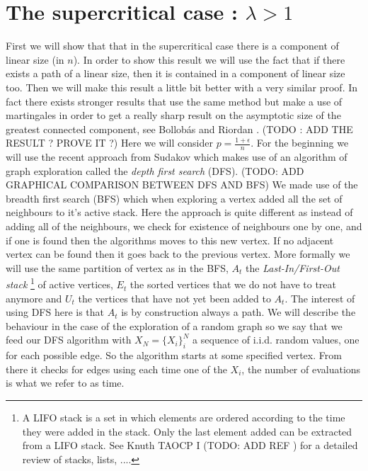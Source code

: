 \section{The supercritical case : $\lambda > 1 $ }
First we will show that that in the supercritical case there is a component of linear size (in $n$). In order to show this result we will use the fact that if there exists a path of a linear size, then it is contained in a component of linear size too. Then we will make this result a little bit better with a very similar proof.
\newline
In fact there exists stronger results that use the same method but make a use of martingales in order to get a really sharp result on the asymptotic size of the greatest connected component, see Bollob\'as and Riordan \cite{BollobRiordan12}. (TODO : ADD THE RESULT ? PROVE IT ?)
\newline
Here we will consider $p = \frac{1 + \epsilon}{n}$. 
For the beginning we will use the recent approach from Sudakov \cite{Sudakov} which makes use of an algorithm of graph exploration called the \emph{depth first search} (DFS).
(TODO: ADD GRAPHICAL COMPARISON BETWEEN DFS AND BFS)
We made use of the breadth first search (BFS) which when exploring a vertex added all the set of neighbours to it's active stack.
Here the approach is quite different as instead of adding all of the neighbours, we check for existence of neighbours one by one, and if one is found then the algorithms moves to this new vertex. If no adjacent vertex can be found then it goes back to the previous vertex.
\newline
More formally we will use the same partition of vertex as in the BFS, $A_t$ the \emph{Last-In/First-Out stack}
\footnote{A LIFO stack is a set in which elements are ordered according to the time they were added in the stack. 
Only the last element added can be extracted from a LIFO stack. See Knuth TAOCP I (TODO: ADD REF ) for a detailed review of stacks, lists, ....}
of active vertices, $E_t$ the sorted vertices that we do not have to treat anymore and $U_t$ the vertices that have not yet been added to $A_t$.
The interest of using DFS here is that $A_t$ is by construction always a path.
\newline
We will describe the behaviour in the case of the exploration of a random graph so we say that we feed our DFS algorithm with $X_N = \{X_i\}_i^N$ a sequence of i.i.d. random values, one for each possible edge.
So the algorithm starts at some specified vertex. From there it checks for edges using each time one of the $X_i$, the number of evaluations is what we refer to as time.
